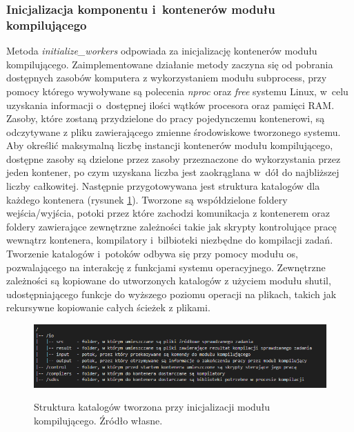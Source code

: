\subsubsection{Inicjalizacja komponentu i~kontenerów modułu kompilującego}
Metoda \textit{initialize\_workers} odpowiada za inicjalizację kontenerów modułu kompilującego. Zaimplementowane działanie metody zaczyna się od pobrania dostępnych zasobów komputera z wykorzystaniem modułu subprocess\cite{pythonSubprocess}, przy pomocy którego wywoływane są polecenia \textit{nproc}\cite{linuxNproc} oraz \textit{free}\cite{linuxFree} systemu Linux, w~celu uzyskania informacji o~dostępnej ilości wątków procesora oraz pamięci RAM. Zasoby, które zostaną przydzielone do pracy pojedynczemu kontenerowi, są odczytywane z pliku zawierającego zmienne środowiskowe tworzonego systemu. Aby określić maksymalną liczbę instancji kontenerów modułu kompilującego, dostępne zasoby są dzielone przez zasoby przeznaczone do wykorzystania przez jeden kontener, po czym uzyskana liczba jest zaokrąglana w~dół do najbliższej liczby całkowitej. Następnie przygotowywana jest struktura katalogów dla każdego kontenera (rysunek \ref{fig:scheduler-directory-structure}). Tworzone są współdzielone foldery wejścia/wyjścia, potoki przez które zachodzi komunikacja z kontenerem oraz foldery zawierające zewnętrzne zależności takie jak skrypty kontrolujące pracę wewnątrz kontenera, kompilatory i~bilbioteki niezbędne do kompilacji zadań. Tworzenie katalogów i~potoków odbywa się przy pomocy modułu os\cite{pytohnOs}, pozwalającego na interakcję z funkcjami systemu operacyjnego. Zewnętrzne zależności są kopiowane do utworzonych katalogów z użyciem modułu shutil\cite{pythonShutil}, udostępniającego funkcje do wyższego poziomu operacji na plikach, takich jak rekursywne kopiowanie całych ścieżek z plikami.
\begin{figure}[!ht]
	\begin{center}
		\resizebox{1\textwidth}{!} {
			\includegraphics{img/3/orkiestrator-kontenerow-struktura-katalogow.png}
		}
		\caption{Struktura katalogów tworzona przy inicjalizacji modułu kompilującego. Źródło własne.}
		\label{fig:scheduler-directory-structure}
	\end{center}
\end{figure}
